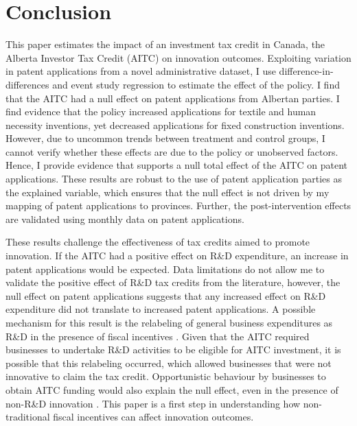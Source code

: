\documentclass[../main.tex]{subfiles}
\begin{document}
\section{Conclusion}
\label{sec:conclusions}

This paper estimates the impact of an investment tax credit in Canada, the Alberta Investor Tax Credit (AITC) on innovation outcomes. Exploiting variation in patent applications from a novel administrative dataset, I use difference-in-differences and event study regression to estimate the effect of the policy. I find that the AITC had a null effect on patent applications from Albertan parties. I find evidence that the policy increased applications for textile and human necessity inventions, yet decreased applications for fixed construction inventions. However, due to uncommon trends between treatment and control groups, I cannot verify whether these effects are due to the policy or unobserved factors. Hence, I provide evidence that supports a null total effect of the AITC on patent applications. These results are robust to the use of patent application parties as the explained variable, which ensures that the null effect is not driven by my mapping of patent applications to provinces. Further, the post-intervention effects are validated using monthly data on patent applications. 

These results challenge the effectiveness of tax credits aimed to promote innovation. If the AITC had a positive effect on R\&D expenditure, an increase in patent applications would be expected. Data limitations do not allow me to validate the positive effect of R\&D tax credits from the literature, however, the null effect on patent applications suggests that any increased effect on R\&D expenditure did not translate to increased patent applications. A possible mechanism for this result is the relabeling of general business expenditures as R\&D in the presence of fiscal incentives \parencite{chen_etal21}. Given that the AITC required businesses to undertake R\&D activities to be eligible for AITC investment, it is possible that this relabeling occurred, which allowed businesses that were not innovative to claim the tax credit. Opportunistic behaviour by businesses to obtain AITC funding would also explain the null effect, even in the presence of non-R\&D innovation \parencite{xie_etal19}. This paper is a first step in understanding how non-traditional fiscal incentives can affect innovation outcomes. 
\end{document}
